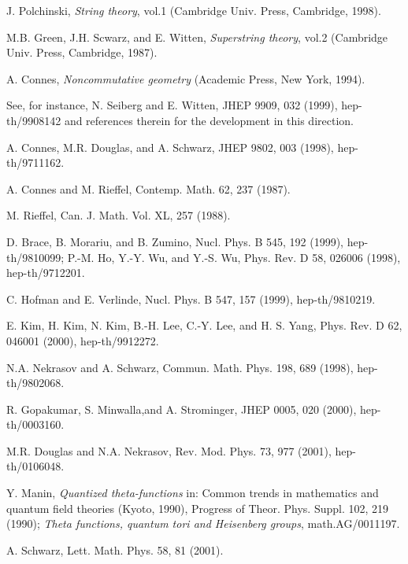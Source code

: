 \documentclass[12pt, a4paper]{article}
\begin{document}




\begin{thebibliography}{88}

 J. Polchinski, {\it String theory}, vol.1 (Cambridge
Univ. Press, Cambridge, 1998).

 M.B. Green, J.H. Scwarz, and E. Witten,
 {\it Superstring theory}, vol.2 (Cambridge Univ. Press, Cambridge, 1987).

 A. Connes, {\it Noncommutative geometry} (Academic Press, New York, 1994).

 See, for instance, N. Seiberg and E. Witten,
JHEP 9909,  032 (1999), hep-th/9908142 and references therein for
the development in this direction.

 A. Connes, M.R. Douglas, and A. Schwarz,
JHEP 9802, 003 (1998), hep-th/9711162.

 A. Connes and M. Rieffel,
Contemp. Math. 62,  237 (1987).

 M. Rieffel, Can. J. Math. Vol. XL, 257 (1988).

 D. Brace, B. Morariu, and B. Zumino,
Nucl. Phys. B 545, 192 (1999),  hep-th/9810099;
  P.-M. Ho, Y.-Y. Wu, and Y.-S. Wu,
Phys. Rev. D 58, 026006 (1998), hep-th/9712201.

 C. Hofman and E. Verlinde,
Nucl. Phys. B 547, 157 (1999), hep-th/9810219.

 E. Kim, H. Kim, N. Kim, B.-H. Lee, C.-Y. Lee, and H. S. Yang,
Phys. Rev. D 62, 046001 (2000),  hep-th/9912272.

 N.A. Nekrasov and A. Schwarz, Commun. Math. Phys. 198, 689 (1998), hep-th/9802068.

 R. Gopakumar, S. Minwalla,and A. Strominger, JHEP 0005, 020 (2000),
          hep-th/0003160.

 M.R. Douglas and N.A. Nekrasov, Rev. Mod. Phys. 73, 977 (2001), hep-th/0106048.

 Y. Manin, {\it Quantized theta-functions} in:
Common trends in mathematics and quantum field theories (Kyoto,
1990), Progress of Theor. Phys. Suppl. 102, 219 (1990);
 {\it Theta functions, quantum tori and Heisenberg groups}, math.AG/0011197.

 A. Schwarz, Lett. Math. Phys. 58,  81 (2001).


\end{thebibliography}
\end{document}
